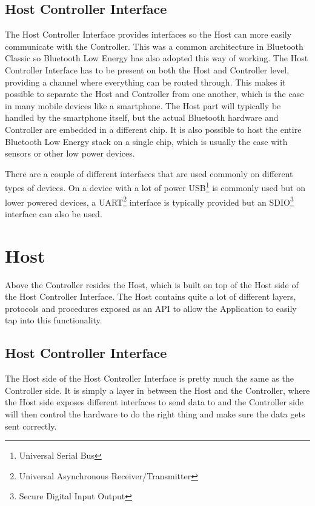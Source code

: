 \documentclass[pdftex,a4paper,12pt,twoside]{report}
\begin{document}
\subsection{Host Controller Interface}
\label{subsec:controllerHCI}
The Host Controller Interface provides interfaces so the Host can more easily communicate with the Controller. This was a common architecture in Bluetooth Classic so Bluetooth Low Energy has also adopted this way of working. The Host Controller Interface has to be present on both the Host and Controller level, providing a channel where everything can be routed through. This makes it possible to separate the Host and Controller from one another, which is the case in many mobile devices like a smartphone. The Host part will typically be handled by the smartphone itself, but the actual Bluetooth hardware and Controller are embedded in a different chip. It is also possible to host the entire Bluetooth Low Energy stack on a single chip, which is usually the case with sensors or other low power devices.

There are a couple of different interfaces that are used commonly on different types of devices. On a device with a lot of power  USB\footnote{Universal Serial Bus} is commonly used but on lower powered devices, a UART\footnote{Universal Asynchronous Receiver/Transmitter} interface is typically provided but an SDIO\footnote{Secure Digital Input Output} interface can also be used.

\section{Host}
\label{sec:stackHost}
Above the Controller resides the Host, which is built on top of the Host side of the Host Controller Interface. The Host contains quite a lot of different layers, protocols and procedures exposed as an API to allow the Application to easily tap into this functionality.

\subsection{Host Controller Interface}
\label{subsec:hostHCI}
The Host side of the Host Controller Interface is pretty much the same as the Controller side. It is simply a layer in between the Host and the Controller, where the Host side exposes different interfaces to send data to and the Controller side will then control the hardware to do the right thing and make sure the data gets sent correctly.
\end{document}
